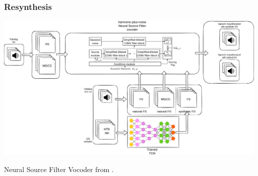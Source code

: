 \documentclass[a4paper,9pt]{beamer}
\theoremstyle{mytheoremstyle}
\begin{document}
\begin{frame}
\frametitle{Resynthesis}
\begin{center}
  \includegraphics[width=\textwidth]{res/resynthesis}
\end{center}
\scriptsize{
\begin{block}{}
Neural Source Filter Vocoder from \parencite{wang2019}.
\end{block}
}
\end{frame}
\end{document}
